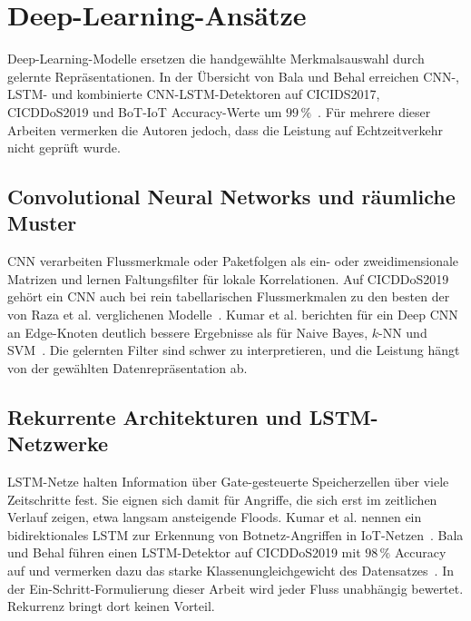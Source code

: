 \section{Deep-Learning-Ansätze}
\label{sec:rw_deep_learning}

Deep-Learning-Modelle ersetzen die handgewählte Merkmalsauswahl durch gelernte Repräsentationen. In der Übersicht von Bala und Behal erreichen CNN-, LSTM- und kombinierte CNN-LSTM-Detektoren auf CICIDS2017, CICDDoS2019 und BoT-IoT Accuracy-Werte um $99\,\%$~\autocite{balaAITechniquesIoTbased2024}. Für mehrere dieser Arbeiten vermerken die Autoren jedoch, dass die Leistung auf Echtzeitverkehr nicht geprüft wurde.

\subsection{Convolutional Neural Networks und räumliche Muster}

CNN verarbeiten Flussmerkmale oder Paketfolgen als ein- oder zweidimensionale Matrizen und lernen Faltungsfilter für lokale Korrelationen. Auf CICDDoS2019 gehört ein CNN auch bei rein tabellarischen Flussmerkmalen zu den besten der von Raza et al. verglichenen Modelle~\autocite{razaFeatureSelectionBasedDDoSAttack2024}. Kumar et al. berichten für ein Deep CNN an Edge-Knoten deutlich bessere Ergebnisse als für Naive Bayes, $k$-NN und SVM~\autocite{kumarComprehensiveReviewVulnerabilities2024}. Die gelernten Filter sind schwer zu interpretieren, und die Leistung hängt von der gewählten Datenrepräsentation ab.

\subsection{Rekurrente Architekturen und LSTM-Netzwerke}

LSTM-Netze halten Information über Gate-gesteuerte Speicherzellen über viele Zeitschritte fest. Sie eignen sich damit für Angriffe, die sich erst im zeitlichen Verlauf zeigen, etwa langsam ansteigende Floods. Kumar et al. nennen ein bidirektionales LSTM zur Erkennung von Botnetz-Angriffen in IoT-Netzen~\autocite{kumarComprehensiveReviewVulnerabilities2024}. Bala und Behal führen einen LSTM-Detektor auf CICDDoS2019 mit $98\,\%$ Accuracy auf und vermerken dazu das starke Klassenungleichgewicht des Datensatzes~\autocite{balaAITechniquesIoTbased2024}. In der Ein-Schritt-Formulierung dieser Arbeit wird jeder Fluss unabhängig bewertet. Rekurrenz bringt dort keinen Vorteil.

